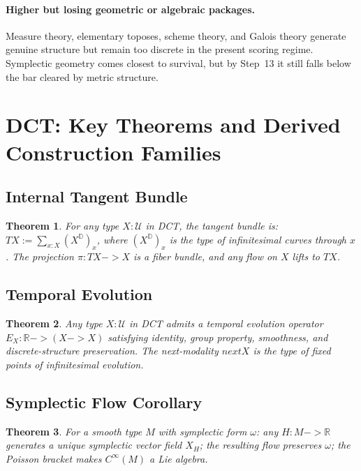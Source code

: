 \documentclass[11pt,a4paper]{article}
\def\to{->}%
\def\bigcirc{next}%
\theoremstyle{plain}
\newtheorem{theorem}{Theorem}[section]
\theoremstyle{definition}
\theoremstyle{remark}
\newcommand{\R}{\mathbb{R}}
\newcommand{\D}{\mathbb{D}}
\newcommand{\U}{\mathcal{U}}
\begin{document}
\paragraph{Higher but losing geometric or algebraic packages.}
Measure theory, elementary toposes, scheme theory, and Galois theory generate genuine structure but remain too discrete in the present scoring regime.
Symplectic geometry comes closest to survival, but by Step~13 it still falls below the bar cleared by metric structure.

\section{DCT: Key Theorems and Derived Construction Families}
\label{app:dct}

\subsection{Internal Tangent Bundle}

\begin{theorem}
\label{thm:tangent}
For any type $X : \U$ in DCT, the tangent bundle is:
$TX := \sum_{x : X} (X^{\D})_x$,
where $(X^{\D})_x$ is the type of infinitesimal curves through $x$.
The projection $\pi : TX \to X$ is a fiber bundle, and any flow on $X$ lifts to $TX$.
\end{theorem}

\subsection{Temporal Evolution}

\begin{theorem}
\label{thm:temporal}
Any type $X : \U$ in DCT admits a temporal evolution operator $E_X : \R \to (X \to X)$ satisfying identity, group property, smoothness, and discrete-structure preservation.
The next-modality $\bigcirc X$ is the type of fixed points of infinitesimal evolution.
\end{theorem}

\subsection{Symplectic Flow Corollary}

\begin{theorem}
\label{thm:symplectic-flow}
For a smooth type $M$ with symplectic form $\omega$:
any $H : M \to \R$ generates a unique symplectic vector field $X_H$;
the resulting flow preserves $\omega$;
the Poisson bracket makes $C^\infty(M)$ a Lie algebra.
\end{theorem}
\end{document}
